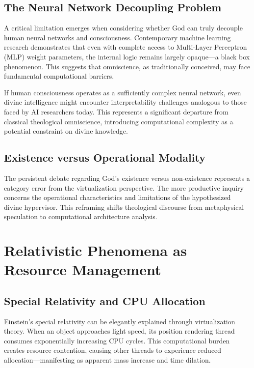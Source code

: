 \documentclass[12pt,a4paper]{article}
\begin{document}
\subsection{The Neural Network Decoupling Problem}

A critical limitation emerges when considering whether God can truly decouple human neural networks and consciousness. Contemporary machine learning research demonstrates that even with complete access to Multi-Layer Perceptron (MLP) weight parameters, the internal logic remains largely opaque—a black box phenomenon. This suggests that omniscience, as traditionally conceived, may face fundamental computational barriers.

If human consciousness operates as a sufficiently complex neural network, even divine intelligence might encounter interpretability challenges analogous to those faced by AI researchers today. This represents a significant departure from classical theological omniscience, introducing computational complexity as a potential constraint on divine knowledge.

\subsection{Existence versus Operational Modality}

The persistent debate regarding God's existence versus non-existence represents a category error from the virtualization perspective. The more productive inquiry concerns the operational characteristics and limitations of the hypothesized divine hypervisor. This reframing shifts theological discourse from metaphysical speculation to computational architecture analysis.

\section{Relativistic Phenomena as Resource Management}

\subsection{Special Relativity and CPU Allocation}

Einstein's special relativity can be elegantly explained through virtualization theory. When an object approaches light speed, its position rendering thread consumes exponentially increasing CPU cycles. This computational burden creates resource contention, causing other threads to experience reduced allocation—manifesting as apparent mass increase and time dilation.
\end{document}
